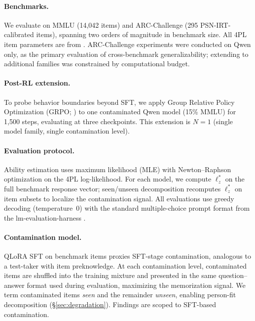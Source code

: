 \paragraph{Benchmarks.}
We evaluate on MMLU \citep{hendrycks2021mmlu} (14,042 items) and ARC-Challenge \citep{clark2018arc} (295 PSN-IRT-calibrated items), spanning two orders of magnitude in benchmark size.
All 4PL item parameters are from \citet{psnirt2026}.
ARC-Challenge experiments were conducted on Qwen only, as the primary evaluation of cross-benchmark generalizability; extending to additional families was constrained by computational budget.

\paragraph{Post-RL extension.}
To probe behavior boundaries beyond SFT, we apply Group Relative Policy Optimization (GRPO; \citealp{shao2024}) to one contaminated Qwen model (15\% MMLU) for 1,500 steps, evaluating at three checkpoints.
This extension is $N{=}1$ (single model family, single contamination level).

\paragraph{Evaluation protocol.}
Ability estimation uses maximum likelihood (MLE) with Newton--Raphson optimization on the 4PL log-likelihood.
For each model, we compute $\ell_z^*$ on the full benchmark response vector; seen/unseen decomposition recomputes $\ell_z^*$ on item subsets to localize the contamination signal.
All evaluations use greedy decoding (temperature~0) with the standard multiple-choice prompt format from the lm-evaluation-harness \citep{eval-harness}.

\paragraph{Contamination model.}
QLoRA SFT on benchmark items proxies SFT-stage contamination, analogous to a test-taker with item preknowledge.
At each contamination level, contaminated items are shuffled into the training mixture and presented in the same question--answer format used during evaluation, maximizing the memorization signal.
We term contaminated items \emph{seen} and the remainder \emph{unseen}, enabling person-fit decomposition (\S\ref{sec:degradation}).
Findings are scoped to SFT-based contamination.
